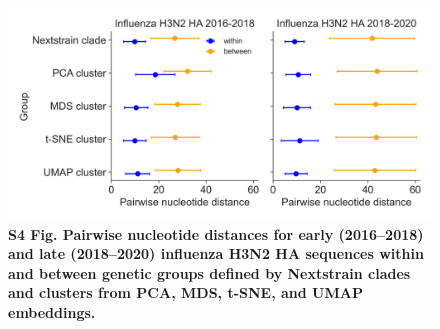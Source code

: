 \documentclass[10pt,letterpaper]{article}
\begin{document}
\begin{figure}[!h]
\includegraphics[width=\columnwidth]{figures/within_between_influenza.png}
\caption*{{\bf S4 Fig. Pairwise nucleotide distances for early (2016--2018) and late (2018--2020) influenza H3N2 HA sequences within and between genetic groups defined by Nextstrain clades and clusters from PCA, MDS, t-SNE, and UMAP embeddings.}}
\end{figure}
\end{document}
